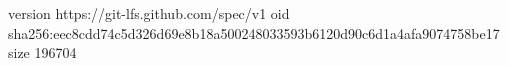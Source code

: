 version https://git-lfs.github.com/spec/v1
oid sha256:eec8cdd74c5d326d69e8b18a500248033593b6120d90c6d1a4afa9074758be17
size 196704
